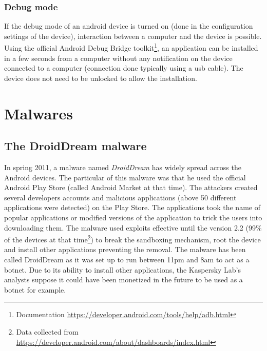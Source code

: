 \subsubsection{Debug mode}
If the debug mode of an android device is turned on (done in the configuration settings of the device), interaction between a computer and the device is possible.
Using the official Android Debug Bridge toolkit\footnote{Documentation \url{https://developer.android.com/tools/help/adb.html}}, an application can be installed in a few seconds from a computer without any notification on the device connected to a computer (connection done typically using a usb cable).
The device does not need to be unlocked to allow the installation.

\section{Malwares}

\subsection{The DroidDream malware}

In spring 2011, a malware named \emph{DroidDream} has widely spread across the Android devices.
The particular of this malware was that he used the official Android Play Store (called Android Market at that time).
The attackers created several developers accounts and malicious applications (above 50 different applications were detected) on the Play Store.
The applications took the name of popular applications or modified versions of the application to trick the users into downloading them.
The malware used exploits effective until the version 2.2 (99\% of the devices at that time\footnote{Data collected from \url{https://developer.android.com/about/dashboards/index.html}}) to break the sandboxing mechanism, root the device and install other applications preventing the removal.
The malware has been called DroidDream as it was set up to run between 11pm and 8am to act as a botnet.
Due to its ability to install other applications, the Kaspersky Lab's analysts suppose it could have been monetized in the future to be used as a botnet for example.\\

